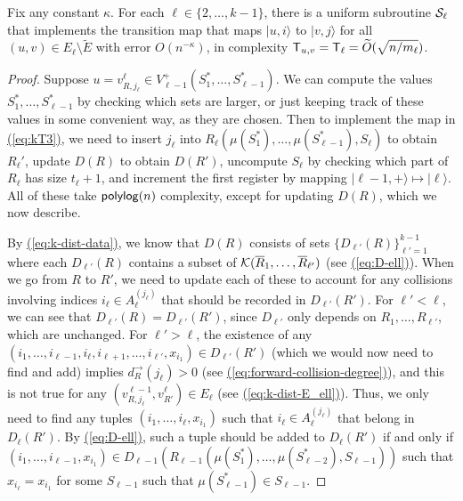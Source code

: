 \documentclass{theoretics}
\newcommand{\eq}[1]{\hyperref[eq:#1]{(\ref*{eq:#1})}}
\def\ket#1{{\lvert}#1\rangle}
\renewcommand{\>}{\rangle}
\newcommand{\<}{\langle}
\renewcommand{\(}{\left(}
\renewcommand{\)}{\right)}
\begin{document}
\begin{lemma}\label{lem:k-dist-k1}
	Fix any constant $\kappa$. For each $\ell\in\{2,\dots,k-1\}$, there is a uniform subroutine ${\cal S}_{\ell}$ that implements the transition map that maps $\ket{u,i}$ to $\ket{v,j}$ for all $(u,v)\in E_{\ell}\setminus\tilde{E}$ with error $O(n^{-\kappa})$, in complexity ${\sf T}_{u,v}={\sf T}_{\ell}=\widetilde{O}(\sqrt{n/m_{\ell}})$. 
\end{lemma}
\begin{proof}
Suppose $u=v^{\ell}_{R,j_{\ell}}\in V_{\ell-1}^+(S_1^*,\dots,S_{\ell-1}^*)$. We can compute the values $S_1^*,\dots,S_{\ell-1}^*$ by checking which sets are larger, or just keeping track of these values in some convenient way, as they are chosen. Then to implement the map in \eq{kT3}, we need to insert $j_{\ell}$ into $R_{\ell}(\mu(S_1^*),\dots,\mu(S^*_{\ell-1}),S_{\ell})$ to obtain $R_{\ell}'$, update $D(R)$ to obtain $D(R')$, uncompute $S_{\ell}$ by checking which part of $R_{\ell}$ has size $t_{\ell}+1$, and increment the first register by mapping $\ket{\ell-1,+}\mapsto \ket{\ell}$. All of these take ${\sf polylog}(n)$ complexity, except for updating $D(R)$, which we now describe.

By \eq{k-dist-data}, we know that $D(R)$ consists of sets $\{D_{\ell'}(R)\}_{\ell'=1}^{k-1}$ where each $D_{\ell'}(R)$ contains a subset of ${\cal K}(\overline{R}_1,\dots,\overline{R}_{\ell'})$ (see \eq{D-ell}). When we go from $R$ to $R'$, we need to update each of these to account for any collisions involving indices $i_{\ell}\in A_{\ell}^{(j_{\ell})}$ that should be recorded in $D_{\ell'}(R')$. For $\ell'<\ell$, we can see that $D_{\ell'}(R)=D_{\ell'}(R')$, since $D_{\ell'}$ only depends on $R_1,\dots,R_{\ell'}$, which are unchanged. For $\ell'>\ell$, the existence of any $(i_1,\dots,i_{\ell-1},i_{\ell},i_{\ell+1},\dots,i_{\ell'},x_{i_1})\in D_{\ell'}(R')$ (which we would now need to find and add) implies $d_R^{\rightarrow}(j_{\ell})>0$ (see \eq{forward-collision-degree}), and this is not true for any $(v_{R,j_{\ell}}^{\ell-1},v_{R'}^{\ell})\in E_{\ell}$ (see \eq{k-dist-E_ell}). Thus, we only need to find any tuples $(i_1,\dots,i_{\ell},x_{i_1})$ such that $i_{\ell}\in A_{\ell}^{(j_{\ell})}$ that belong in $D_{\ell}(R')$. By \eq{D-ell}, such a tuple should be added to $D_{\ell}(R')$ if and only if $(i_1,\dots,i_{\ell-1},x_{i_1})\in D_{\ell-1}(R_{\ell-1}(\mu(S_1^*),\dots,\mu(S_{\ell-2}^*),S_{\ell-1}))$ such that $x_{i_{\ell}}=x_{i_1}$ for some $S_{\ell-1}$ such that $\mu(S_{\ell-1}^*)\in S_{\ell-1}$.


\end{proof}
\end{document}

